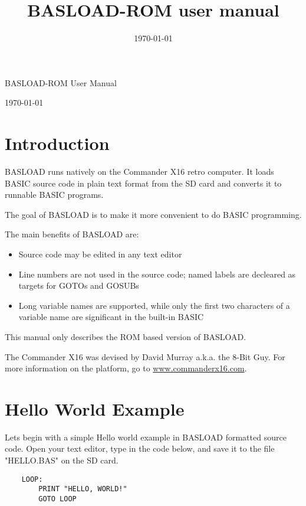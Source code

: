 \documentclass{article}
\title{BASLOAD-ROM user manual}
\date{\today}
\begin{document}
\begin{huge}
    BASLOAD-ROM User Manual
\end{huge}

\vspace{1em}
\today

\vspace{4em}
\tableofcontents
\vspace{4em}

\section{Introduction}

    BASLOAD runs natively on the Commander X16 retro computer. It loads BASIC 
    source code in plain text format from the SD card and converts it to 
    runnable BASIC programs.

    The goal of BASLOAD is to make it more convenient to do BASIC programming.

    The main benefits of BASLOAD are:

    \begin{itemize}
        \item Source code may be edited in any text editor
        \item Line numbers are not used in the source code; named labels are 
              decleared as targets for GOTOs and GOSUBs
        \item Long variable names are supported, while only the first two 
              characters of a variable name are significant in the built-in 
              BASIC
    \end{itemize}
    
    This manual only describes the ROM based version of BASLOAD.

    The Commander X16 was devised by David Murray a.k.a. the 
    8-Bit Guy. For more information on the platform, go to 
    \href{http://www.commanderx16.com}{www.commanderx16.com}.

\section{Hello World Example}

    Lets begin with a simple Hello world example in BASLOAD formatted
    source code. Open your text editor, type in the code below, and save it to
    the file "HELLO.BAS" on the SD card.

    \begin{verbatim}
    LOOP:
        PRINT "HELLO, WORLD!"
        GOTO LOOP
    \end{verbatim}
\end{document}
